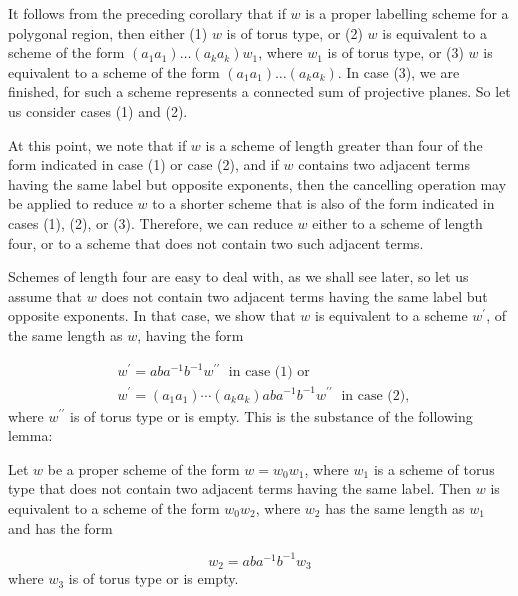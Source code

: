 It follows from the preceding corollary that if \(w\) is a proper labelling scheme for a polygonal region, then either (1) \(w\) is of torus type, or (2) \(w\) is equivalent to a scheme of the form \(( {a_{1}a_{1}}) \ldots ( {a_{k}a_{k}}) w_{1}\), where \(w_{1}\) is of torus type, or (3) \(w\) is equivalent to a scheme of the form \(( {a_{1}a_{1}}) \ldots ( {a_{k}a_{k}})\). In case (3), we are finished, for such a scheme represents a connected sum of projective planes. So let us consider cases (1) and (2).

At this point, we note that if \(w\) is a scheme of length greater than four of the form indicated in case (1) or case (2), and if \(w\) contains two adjacent terms having the same label but opposite exponents, then the cancelling operation may be applied to reduce \(w\) to a shorter scheme that is also of the form indicated in cases (1), (2), or (3). Therefore, we can reduce \(w\) either to a scheme of length four, or to a scheme that does not contain two such adjacent terms.

Schemes of length four are easy to deal with, as we shall see later, so let us assume that \(w\) does not contain two adjacent terms having the same label but opposite exponents. In that case, we show that \(w\) is equivalent to a scheme \(w^{\prime }\), of the same length as \(w\), having the form

\[
\begin{aligned} & w^{\prime } = {ab}a^{-1}b^{-1}w^{\prime \prime }\;\text{ in case (1) or } \\ & w^{\prime } = ( {a_{1}a_{1}}) \cdots ( {a_{k}a_{k}}) {ab}a^{-1}b^{-1}w^{\prime \prime }\;\text{ in case (2), } \end{aligned}
\]
where \(w^{\prime \prime }\) is of torus type or is empty. This is the substance of the following lemma:
\begin{lemma}
\label{lem:\thetheorem}
	Let \(w\) be a proper scheme of the form \(w = w_{0}w_{1}\), where \(w_{1}\) is a scheme of torus type that does not contain two adjacent terms having the same label. Then \(w\) is equivalent to a scheme of the form \(w_{0}w_{2}\), where \(w_{2}\) has the same length as \(w_{1}\) and has the form

\[
w_{2} = {ab}a^{-1}b^{-1}w_{3}
\]
where \(w_{3}\) is of torus type or is empty.
\end{lemma}

